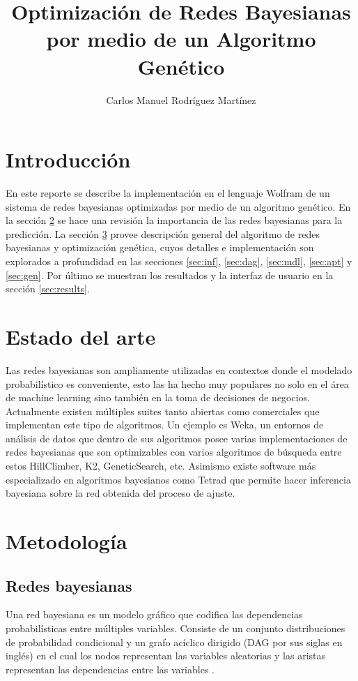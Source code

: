 \documentclass[10pt,a4paper]{article}
\author{Carlos Manuel Rodríguez Martínez}
\title{Optimización de Redes Bayesianas por medio de un Algoritmo Genético}
\begin{document}
\maketitle

\section{Introducción}
En este reporte se describe la implementación en el lenguaje Wolfram de un sistema de redes bayesianas optimizadas por medio de un algoritmo genético. En la sección \ref{sec:state} se hace una revisión la importancia de las redes bayesianas para la predicción. La sección \ref{sec:met} provee descripción general del algoritmo de redes bayesianas y optimización genética, cuyos detalles e implementación son explorados a profundidad en las secciones \ref{sec:inf}, \ref{sec:dag}, \ref{sec:mdl}, \ref{sec:apt} y \ref{sec:gen}. Por último se muestran los resultados y la interfaz de usuario en la sección \ref{sec:results}.

\section{Estado del arte} \label{sec:state}
Las redes bayesianas son ampliamente utilizadas en contextos donde el modelado probabilístico es conveniente, esto las ha hecho muy populares no solo en el área de machine learning sino también en la toma de decisiones de negocios. Actualmente existen múltiples suites tanto abiertas como comerciales que implementan este tipo de algoritmos. Un ejemplo es Weka, un entornos de análisis de datos que dentro de sus algoritmos posee varias implementaciones de redes bayesianas que son optimizables con varios algoritmos de búsqueda entre estos HillClimber, K2, GeneticSearch, etc. Asimismo existe software más especializado en algoritmos bayesianos como Tetrad que permite hacer inferencia bayesiana sobre la red obtenida del proceso de ajuste.

\section{Metodología} \label{sec:met}

\subsection{Redes bayesianas}
Una red bayesiana es un modelo gráfico que codifica las dependencias probabilísticas entre múltiples variables. Consiste de un conjunto distribuciones de probabilidad condicional y un grafo acíclico dirigido (DAG por sus siglas en inglés) en el cual los nodos representan las variables aleatorias y las aristas representan las dependencias entre las variables \cite{MDL}.
\end{document}
